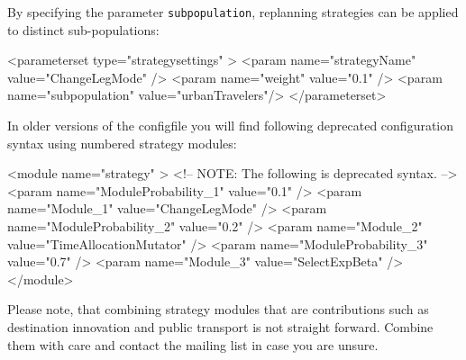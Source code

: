 By specifying the parameter \lstinline|subpopulation|, replanning strategies can be applied to distinct sub-populations: \eg
\begin{xml}
	<parameterset type="strategysettings" >
		<param name="strategyName" value="ChangeLegMode" />
		<param name="weight" value="0.1" />
		<param name="subpopulation" value="urbanTravelers"/>
	</parameterset>
\end{xml}

In older versions of the \gls{configfile} you will find following deprecated configuration syntax using numbered strategy modules:
%
\begin{xml}
<module name="strategy" >
    <!-- NOTE: The following is deprecated syntax. -->
    <param name="ModuleProbability_1" value="0.1" /> 
    <param name="Module_1" value="ChangeLegMode" />
    <param name="ModuleProbability_2" value="0.2" />
    <param name="Module_2" value="TimeAllocationMutator" />
    <param name="ModuleProbability_3" value="0.7" />
    <param name="Module_3" value="SelectExpBeta" />
</module>
\end{xml}
%
%
%


Please note, that combining strategy modules that are \glspl{contribution} such as destination innovation and public transport is not straight forward. Combine them with care and contact the mailing list in case you are unsure.

